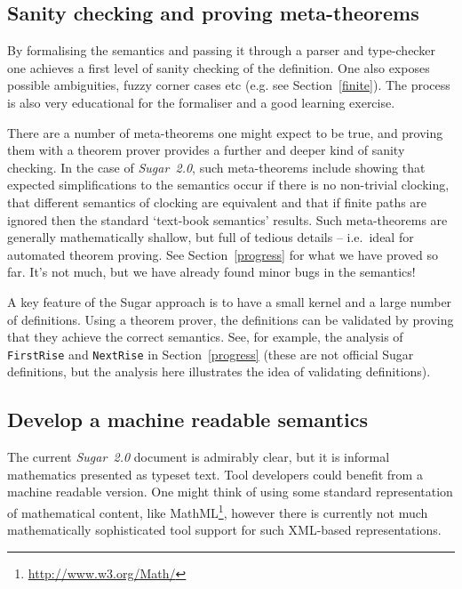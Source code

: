 \documentclass{llncs}
\newcommand\Sugar{{\it{Sugar~2.0}}\xspace}
\renewcommand{\t}[1]{\texttt{#1}}
\begin{document}
\vspace*{-3mm}

\subsection{Sanity checking and proving meta-theorems}


By formalising the semantics and passing it through a parser and
type-checker one achieves a first level of sanity checking of the
definition. One also exposes possible ambiguities, fuzzy corner cases etc
(e.g. see Section~\ref{finite}).
The process is also very educational for the formaliser and
a good learning exercise.

There are a number of meta-theorems one might expect to be true, and
proving them with a theorem prover provides a further and deeper kind
of sanity checking.  In the case of \Sugar, such meta-theorems include
showing that expected simplifications to the semantics occur if
there is no non-trivial clocking, that different semantics of clocking
are equivalent and that if finite paths are ignored then the standard
`text-book semantics' results. Such meta-theorems are generally mathematically
shallow, but full of tedious details -- i.e.~ideal for automated
theorem proving. See Section~\ref{progress} for what we have proved so far. 
It's not much, but we have already found minor bugs in the semantics!

A key feature of the Sugar approach is to have a small kernel and a large
number of definitions. Using a theorem prover,
the definitions can be validated by proving that they achieve the
correct semantics.  See, for example, the analysis of \t{FirstRise}
and \t{NextRise} in Section~\ref{progress} (these are not official
Sugar definitions, but the analysis here illustrates the idea of
validating definitions).
\vspace*{-3mm}

\subsection{Develop a machine readable semantics}

The current \Sugar document is admirably clear, but it is informal mathematics presented
as typeset text. Tool developers  could benefit from a machine readable version.
One might think of using some standard representation of mathematical content,
like  MathML\footnote{\url{http://www.w3.org/Math/}}, however there is currently
not much mathematically sophisticated tool support for such XML-based representations. 
\end{document}

